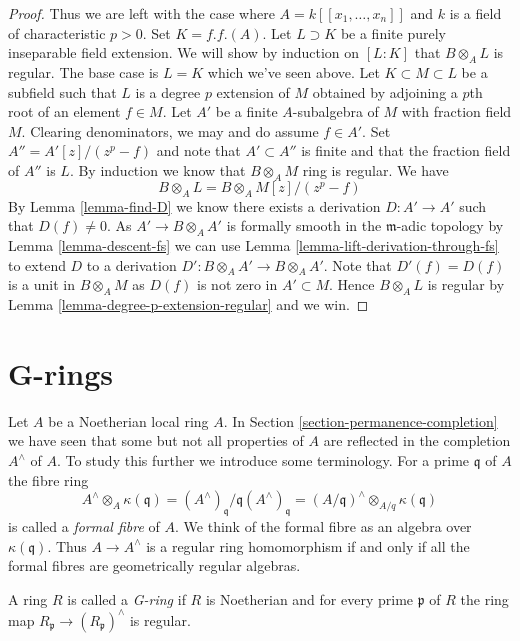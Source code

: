 \begin{proof}
\medskip\noindent
Thus we are left with the case where $A = k[[x_1, \ldots, x_n]]$
and $k$ is a field of characteristic $p > 0$. Set $K = f.f.(A)$.
Let $L \supset K$ be a finite purely inseparable field extension.
We will show by induction on $[L : K]$ that $B \otimes_A L$
is regular. The base case is $L = K$ which we've seen above.
Let $K \subset M \subset L$ be a subfield such that
$L$ is a degree $p$ extension of $M$ obtained by adjoining a $p$th root
of an element $f \in M$. Let $A'$ be a finite $A$-subalgebra
of $M$ with fraction field $M$. Clearing denominators, we may and do assume
$f \in A'$. Set $A'' = A'[z]/(z^p -f)$ and note that $A' \subset A''$
is finite and that the fraction field of $A''$ is $L$.
By induction we know that $B \otimes_A M$ ring is regular.
We have
$$
B \otimes_A L = B \otimes_A M[z]/(z^p - f)
$$
By Lemma \ref{lemma-find-D} we know there exists a derivation
$D : A' \to A'$ such that $D(f) \not = 0$. As $A' \to B \otimes_A A'$
is formally smooth in the $\mathfrak m$-adic topology by
Lemma \ref{lemma-descent-fs}
we can use
Lemma \ref{lemma-lift-derivation-through-fs}
to extend $D$ to a derivation $D' : B \otimes_A A' \to B \otimes_A A'$.
Note that $D'(f) = D(f)$ is a unit in $B \otimes_A M$ as $D(f)$
is not zero in $A' \subset M$. Hence $B \otimes_A L$ is regular by
Lemma \ref{lemma-degree-p-extension-regular} and we win.
\end{proof}





\section{G-rings}
\label{section-G-ring}

\noindent
Let $A$ be a Noetherian local ring $A$. In
Section \ref{section-permanence-completion}
we have seen that some but not all properties of $A$ are reflected in
the completion $A^\wedge$ of $A$. To study this further we introduce
some terminology. For a prime $\mathfrak q$ of $A$ the fibre ring
$$
A^\wedge \otimes_A \kappa(\mathfrak q) =
(A^\wedge)_\mathfrak q/\mathfrak q(A^\wedge)_\mathfrak q =
(A/\mathfrak q)^\wedge \otimes_{A/q} \kappa(\mathfrak q)
$$
is called a {\it formal fibre} of $A$. We think of the formal
fibre as an algebra over $\kappa(\mathfrak q)$. Thus $A \to A^\wedge$
is a regular ring homomorphism if and only if all the formal fibres are
geometrically regular algebras.

\begin{definition}
\label{definition-G-ring}
A ring $R$ is called a {\it G-ring} if $R$ is Noetherian and for every
prime $\mathfrak p$ of $R$ the ring map
$R_\mathfrak p \to (R_\mathfrak p)^\wedge$ is regular.
\end{definition}

